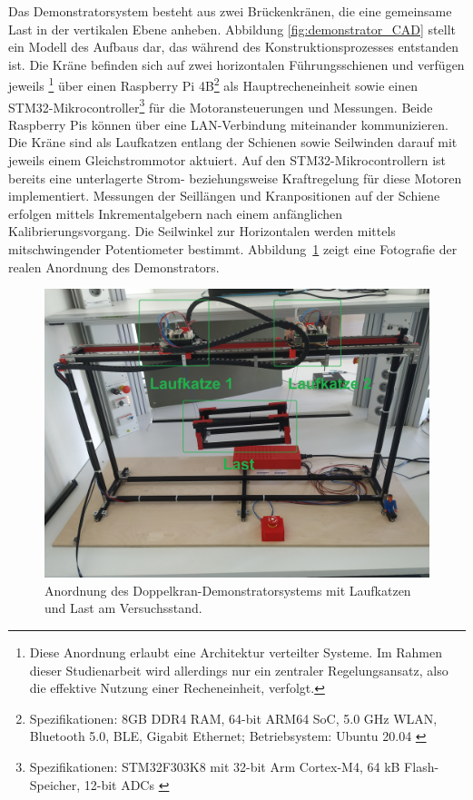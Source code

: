 Das Demonstratorsystem besteht aus zwei Brückenkränen, die eine gemeinsame Last in der vertikalen Ebene anheben. Abbildung \ref{fig:demonstrator_CAD} stellt ein Modell des Aufbaus dar, das während des Konstruktionsprozesses entstanden ist. Die Kräne befinden sich auf zwei horizontalen Führungsschienen und verfügen jeweils \footnote{Diese Anordnung erlaubt eine Architektur verteilter Systeme. Im Rahmen dieser Studienarbeit wird allerdings nur ein zentraler Regelungsansatz, also die effektive Nutzung einer Recheneinheit, verfolgt.} über einen Raspberry Pi 4B\footnote{Spezifikationen: 8GB DDR4 RAM, 64-bit ARM64 SoC, 5.0 GHz WLAN, Bluetooth 5.0, BLE, Gigabit Ethernet; Betriebsystem: Ubuntu 20.04 \cite{RpiSpecs}} als Hauptrecheneinheit sowie einen STM32-Mikrocontroller\footnote{Spezifikationen: STM32F303K8 mit 32-bit Arm Cortex-M4, 64 kB Flash-Speicher, 12-bit ADCs \cite{STM32Specs}} für die Motoransteuerungen und Messungen. Beide Raspberry Pis können über eine LAN-Verbindung miteinander kommunizieren. Die Kräne sind als Laufkatzen entlang der Schienen sowie Seilwinden darauf mit jeweils einem Gleichstrommotor aktuiert. Auf den STM32-Mikrocontrollern ist bereits eine unterlagerte Strom- beziehungsweise Kraftregelung für diese Motoren implementiert.
Messungen der Seillängen und Kranpositionen auf der Schiene erfolgen mittels Inkrementalgebern nach einem anfänglichen Kalibrierungsvorgang. Die Seilwinkel zur Horizontalen werden mittels mitschwingender Potentiometer bestimmt. Abbildung~\ref{fig:demonstrator_real} zeigt eine Fotografie der realen Anordnung des Demonstrators.

\begin{figure}[ht]
	\begin{center}
		\includegraphics[scale=0.11]{Pictures/real_gantry.jpg}
	\end{center}
	\caption[Doppelkran-Demonstratorsystem mit Laufkatzen und Last]
	{Anordnung des Doppelkran-Demonstratorsystems mit Laufkatzen und Last am Versuchsstand.}
	\label{fig:demonstrator_real}
\end{figure}


